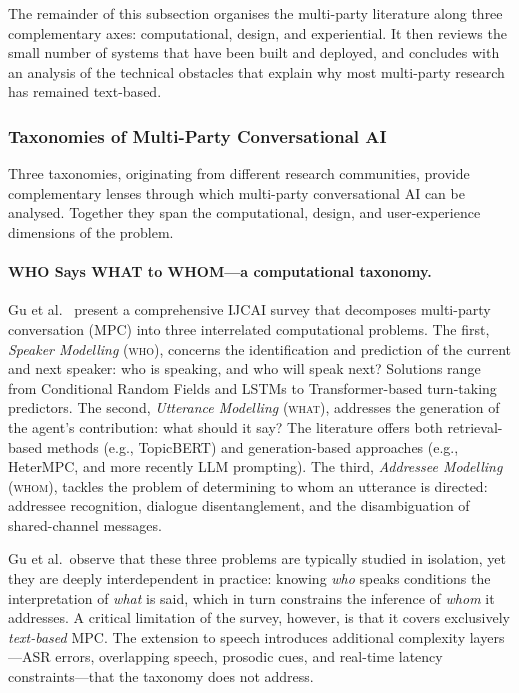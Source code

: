 The remainder of this subsection organises the multi-party literature along
three complementary axes: computational, design, and experiential.  It then
reviews the small number of systems that have been built and deployed, and
concludes with an analysis of the technical obstacles that explain why most
multi-party research has remained text-based.

\subsubsection{Taxonomies of Multi-Party Conversational AI}
\label{sssec:multiparty-taxonomies}

Three taxonomies, originating from different research communities, provide
complementary lenses through which multi-party conversational AI can be
analysed.  Together they span the computational, design, and user-experience
dimensions of the problem.

\paragraph{WHO Says WHAT to WHOM---a computational taxonomy.}
Gu et al.~\cite{gu2022mpc} present a comprehensive IJCAI survey that
decomposes multi-party conversation (MPC) into three interrelated computational
problems.  The first, \emph{Speaker Modelling} (\textsc{who}), concerns the
identification and prediction of the current and next speaker: who is speaking,
and who will speak next?  Solutions range from Conditional Random Fields and
LSTMs to Transformer-based turn-taking predictors.  The second, \emph{Utterance
Modelling} (\textsc{what}), addresses the generation of the agent's
contribution: what should it say?  The literature offers both retrieval-based
methods (e.g., TopicBERT) and generation-based approaches (e.g., HeterMPC, and
more recently LLM prompting).  The third, \emph{Addressee Modelling}
(\textsc{whom}), tackles the problem of determining to whom an utterance is
directed: addressee recognition, dialogue disentanglement, and the
disambiguation of shared-channel messages.

Gu et al.\ observe that these three problems are typically studied in
isolation, yet they are deeply interdependent in practice: knowing \emph{who}
speaks conditions the interpretation of \emph{what} is said, which in turn
constrains the inference of \emph{whom} it addresses.  A critical limitation of
the survey, however, is that it covers exclusively \emph{text-based} MPC.  The
extension to speech introduces additional complexity layers---ASR errors,
overlapping speech, prosodic cues, and real-time latency
constraints---that the taxonomy does not address.

